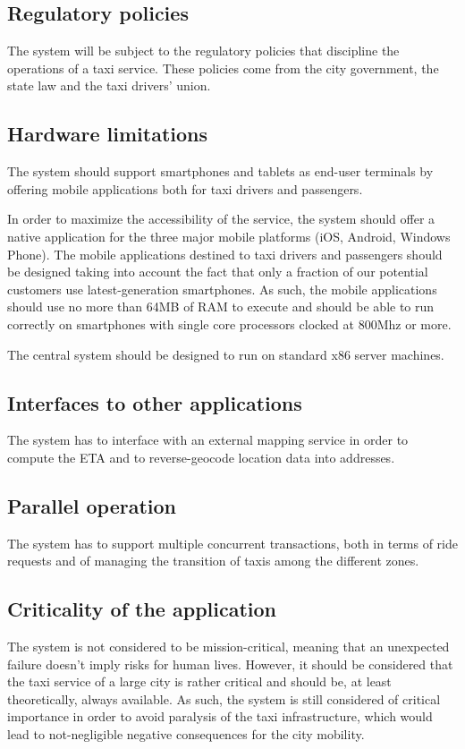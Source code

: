 \subsection{Regulatory policies}
The system will be subject to the regulatory policies that discipline the operations of a taxi service. These policies come from the city government, the state law and the taxi drivers' union.


\subsection{Hardware limitations}
The system should support smartphones and tablets as end-user terminals by offering mobile applications both for taxi drivers and passengers. 

In order to maximize the accessibility of the service, the system should offer a native application for the three major mobile platforms (iOS, Android, Windows Phone).
The mobile applications destined to taxi drivers and passengers should be designed taking into account the fact that only a fraction of our potential customers use latest-generation smartphones. As such, the mobile applications should use no more than 64MB of RAM to execute and should be able to run correctly on smartphones with single core processors clocked at 800Mhz or more.

The central system should be designed to run on standard x86 server machines.


\subsection{Interfaces to other applications}
The system has to interface with an external mapping service in order to compute the ETA and to reverse-geocode location data into addresses.


\subsection{Parallel operation}
The system has to support multiple concurrent transactions, both in terms of ride requests and of managing the transition of taxis among the different zones. 


\subsection{Criticality of the application}
The system is not considered to be mission-critical, meaning that an unexpected failure doesn't imply risks for human lives. 
However, it should be considered that the taxi service of a large city is rather critical and should be, at least theoretically, always available. As such, the system is still considered of critical importance in order to avoid paralysis of the taxi infrastructure, which would lead to not-negligible negative consequences for the city mobility.


